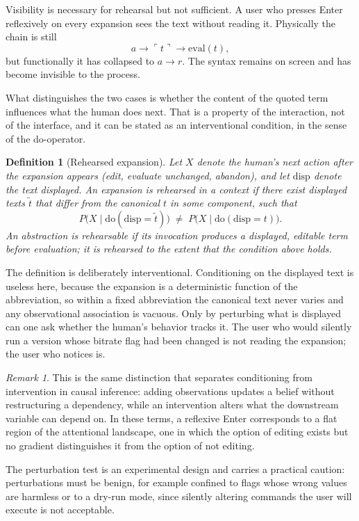\documentclass[11pt]{article}
\newtheorem{definition}{Definition}
\theoremstyle{remark}
\newtheorem{remark}{Remark}
\newcommand{\ql}{\ulcorner}
\newcommand{\qr}{\urcorner}
\newcommand{\quo}[1]{\ql #1\qr}
\begin{document}
Visibility is necessary for rehearsal but not sufficient. A user who presses Enter reflexively on every expansion sees the text without reading it. Physically the chain is still
\[
a \to \quo{t} \to \mathrm{eval}(t),
\]
but functionally it has collapsed to $a \to r$. The syntax remains on screen and has become invisible to the process.

What distinguishes the two cases is whether the content of the quoted term influences what the human does next. That is a property of the interaction, not of the interface, and it can be stated as an interventional condition, in the sense of the do-operator.

\begin{definition}[Rehearsed expansion]
Let $X$ denote the human's next action after the expansion appears (edit, evaluate unchanged, abandon), and let $\mathrm{disp}$ denote the text displayed. An expansion is \emph{rehearsed} in a context if there exist displayed texts $\tilde t$ that differ from the canonical $t$ in some component, such that
\[
P\big(X \mid \mathrm{do}(\mathrm{disp}=\tilde t)\big)\;\neq\;P\big(X \mid \mathrm{do}(\mathrm{disp}=t)\big).
\]
An abstraction is \emph{rehearsable} if its invocation produces a displayed, editable term before evaluation; it is \emph{rehearsed} to the extent that the condition above holds.
\end{definition}

The definition is deliberately interventional. Conditioning on the displayed text is useless here, because the expansion is a deterministic function of the abbreviation, so within a fixed abbreviation the canonical text never varies and any observational association is vacuous. Only by perturbing what is displayed can one ask whether the human's behavior tracks it. The user who would silently run a version whose bitrate flag had been changed is not reading the expansion; the user who notices is.

\begin{remark}
This is the same distinction that separates conditioning from intervention in causal inference: adding observations updates a belief without restructuring a dependency, while an intervention alters what the downstream variable can depend on. In these terms, a reflexive Enter corresponds to a flat region of the attentional landscape, one in which the option of editing exists but no gradient distinguishes it from the option of not editing.
\end{remark}

The perturbation test is an experimental design and carries a practical caution: perturbations must be benign, for example confined to flags whose wrong values are harmless or to a dry-run mode, since silently altering commands the user will execute is not acceptable.
\end{document}
